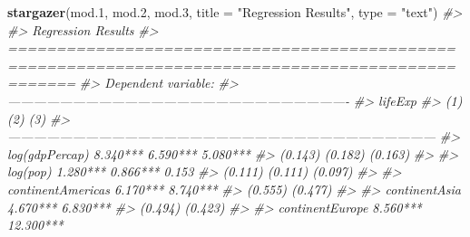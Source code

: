 \documentclass[
]{book}
\newenvironment{Shaded}{\begin{snugshade}}{\end{snugshade}}
\newcommand{\CommentTok}[1]{\textcolor[rgb]{0.56,0.35,0.01}{\textit{#1}}}
\newcommand{\DataTypeTok}[1]{\textcolor[rgb]{0.13,0.29,0.53}{#1}}
\newcommand{\FloatTok}[1]{\textcolor[rgb]{0.00,0.00,0.81}{#1}}
\newcommand{\KeywordTok}[1]{\textcolor[rgb]{0.13,0.29,0.53}{\textbf{#1}}}
\newcommand{\NormalTok}[1]{#1}
\newcommand{\StringTok}[1]{\textcolor[rgb]{0.31,0.60,0.02}{#1}}
\begin{document}
\begin{Shaded}
\begin{Highlighting}[]
\KeywordTok{stargazer}\NormalTok{(mod}\FloatTok{.1}\NormalTok{, mod}\FloatTok{.2}\NormalTok{, mod}\FloatTok{.3}\NormalTok{, }\DataTypeTok{title =} \StringTok{"Regression Results"}\NormalTok{, }\DataTypeTok{type =} \StringTok{"text"}\NormalTok{)}
\CommentTok{#> }
\CommentTok{#> Regression Results}
\CommentTok{#> ===================================================================================================}
\CommentTok{#>                                                   Dependent variable:                              }
\CommentTok{#>                     -------------------------------------------------------------------------------}
\CommentTok{#>                                                         lifeExp                                    }
\CommentTok{#>                                 (1)                        (2)                       (3)           }
\CommentTok{#> ---------------------------------------------------------------------------------------------------}
\CommentTok{#> log(gdpPercap)               8.340***                   6.590***                  5.080***         }
\CommentTok{#>                               (0.143)                    (0.182)                   (0.163)         }
\CommentTok{#>                                                                                                    }
\CommentTok{#> log(pop)                     1.280***                   0.866***                    0.153          }
\CommentTok{#>                               (0.111)                    (0.111)                   (0.097)         }
\CommentTok{#>                                                                                                    }
\CommentTok{#> continentAmericas                                       6.170***                  8.740***         }
\CommentTok{#>                                                          (0.555)                   (0.477)         }
\CommentTok{#>                                                                                                    }
\CommentTok{#> continentAsia                                           4.670***                  6.830***         }
\CommentTok{#>                                                          (0.494)                   (0.423)         }
\CommentTok{#>                                                                                                    }
\CommentTok{#> continentEurope                                         8.560***                  12.300***        }

\end{Highlighting}
\end{Shaded}
\end{document}
